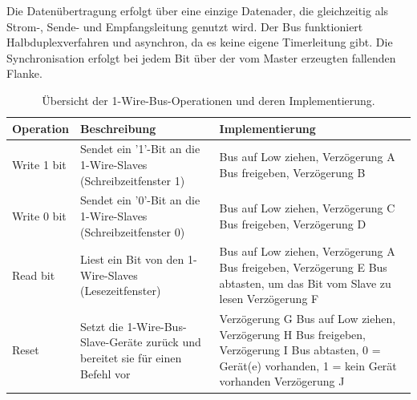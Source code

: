 Die Datenübertragung erfolgt über eine einzige Datenader, die gleichzeitig als Strom-, Sende- und Empfangsleitung
genutzt wird. Der Bus funktioniert Halbduplexverfahren und asynchron, da es keine eigene Timerleitung gibt.
Die Synchronisation erfolgt bei jedem Bit über der vom Master erzeugten fallenden Flanke.
\renewcommand{\arraystretch}{2}%
\begin{table}[ht]
    \centering
    \begin{tabularx}{\textwidth}{|l|X|X|}
        \hline
        \textbf{Operation} & \textbf{Beschreibung}                                                          & \textbf{Implementierung} \\
        \hline
        Write 1 bit        & Sendet ein '1'-Bit an die 1-Wire-Slaves (Schreibzeitfenster 1)                 &
        Bus auf Low ziehen, Verzögerung A Bus freigeben, Verzögerung B                                                                 \\
        \hline
        Write 0 bit        & Sendet ein '0'-Bit an die 1-Wire-Slaves (Schreibzeitfenster 0)                 &
        Bus auf Low ziehen, Verzögerung C Bus freigeben, Verzögerung D                                                                 \\
        \hline
        Read bit           & Liest ein Bit von den 1-Wire-Slaves (Lesezeitfenster)                          &
        Bus auf Low ziehen, Verzögerung A Bus freigeben, Verzögerung E
        Bus abtasten, um das Bit vom Slave zu lesen Verzögerung F                                                                      \\
        \hline
        Reset              & Setzt die 1-Wire-Bus-Slave-Geräte zurück und bereitet sie für einen Befehl vor &
        Verzögerung G Bus auf Low ziehen, Verzögerung H Bus freigeben,
        Verzögerung I Bus abtasten, 0 = Gerät(e) vorhanden, 1 = kein Gerät vorhanden
        Verzögerung J                                                                                                                  \\
        \hline
    \end{tabularx}
    \caption{Übersicht der 1-Wire-Bus-Operationen und deren Implementierung.}
    \label{tab:1wire_operations}
\end{table}

